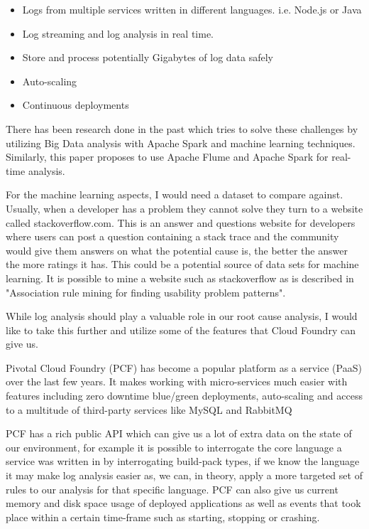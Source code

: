 \begin{itemize}
  \item Logs from multiple services written in different languages. i.e. Node.js or Java
  \item Log streaming and log analysis in real time. 
  \item Store and process potentially Gigabytes of log data safely
  \item Auto-scaling
  \item Continuous deployments
\end{itemize}

There has been research done in the past which tries to solve these challenges by utilizing Big Data analysis with Apache Spark and machine learning techniques\cite{8067504}. Similarly, this paper\cite{7748933} proposes to use Apache Flume and Apache Spark for real-time analysis.

For the machine learning aspects, I would need a dataset to compare against. Usually, when a developer has a problem they cannot solve they turn to a website called stackoverflow.com. This is an answer and questions website for developers where users can post a question containing a stack trace and the community would give them answers on what the potential cause is, the better the answer the more ratings it has. This could be a potential source of data sets for machine learning. It is possible to mine a website such as stackoverflow as is described in "Association rule mining for finding usability problem patterns"\cite{8320144}.

While log analysis should play a valuable role in our root cause analysis, I would like to take this further and utilize some of the features that Cloud Foundry can give us.

Pivotal Cloud Foundry (PCF) has become a popular platform as a service (PaaS) over the last few years\cite{6924673}. It makes working with micro-services much easier with features including zero downtime blue/green deployments, auto-scaling and access to a multitude of third-party services like MySQL and RabbitMQ

PCF has a rich public API which can give us a lot of extra data on the state of our environment, for example it is possible to interrogate the core language a service was written in by interrogating build-pack types, if we know the language it may make log analysis easier as, we can, in theory, apply a more targeted set of rules to our analysis for that specific language. PCF can also give us current memory and disk space usage of deployed applications as well as events that took place within a certain time-frame such as starting, stopping or crashing.